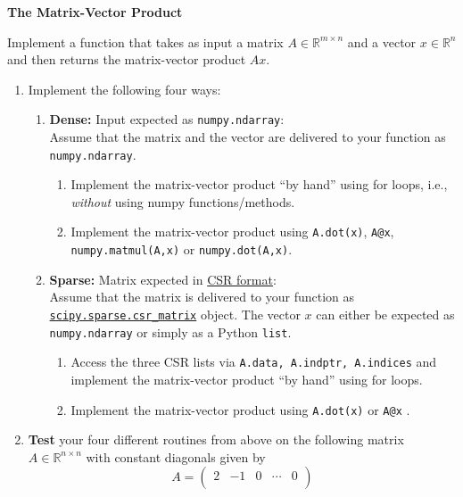 \textbf{The Matrix-Vector Product}

Implement a function that takes as input a matrix $A \in \mathbb{R}^{m\times n}$ and a vector $x \in \mathbb{R}^{n}$ and then returns the matrix-vector product $Ax$.
\begin{enumerate}
	\item 
Implement the following four ways:
\begin{enumerate}	
	\item \textbf{Dense:} Input expected as \verb|numpy.ndarray|:\\
		  Assume that the matrix and the vector are delivered to your function as \verb|numpy.ndarray|.
	\begin{enumerate}
		\item Implement the matrix-vector product ``by hand'' using for loops, i.e., \textit{without} using numpy functions/methods.
		\item Implement the matrix-vector product using \texttt{A.dot(x)}, \verb|A@x|, \verb|numpy.matmul(A,x)| or \verb|numpy.dot(A,x)|. 
	\end{enumerate}
	\item \textbf{Sparse:} Matrix expected in \hyperref{https://en.wikipedia.org/wiki/Sparse_matrix#Compressed_sparse_row_(CSR,_CRS_or_Yale_format)}{}{}{CSR format}:\\
	Assume that the matrix is delivered to your function as \hyperref{https://docs.scipy.org/doc/scipy/reference/generated/scipy.sparse.csr_matrix.html}{}{}{\texttt{scipy.sparse.csr\_matrix}} object. The vector $x$ can either be expected as \verb|numpy.ndarray| or simply as a Python \texttt{list}. 	
	\begin{enumerate}
		\item Access the three CSR lists via \texttt{A.data, A.indptr, A.indices} and implement the matrix-vector product ``by hand'' using for loops.
		\item Implement the matrix-vector product using \texttt{A.dot(x)} or \texttt{A@x} . %
	\end{enumerate}
\end{enumerate}
\item \textbf{Test} your four different routines from above on the following matrix $A \in \mathbb{R}^{n \times n}$ with constant diagonals given by 
$$A = \begin{pmatrix}
2 & -1 		& 0  &\cdots & 0\\

\end{pmatrix}$$
\end{enumerate}
